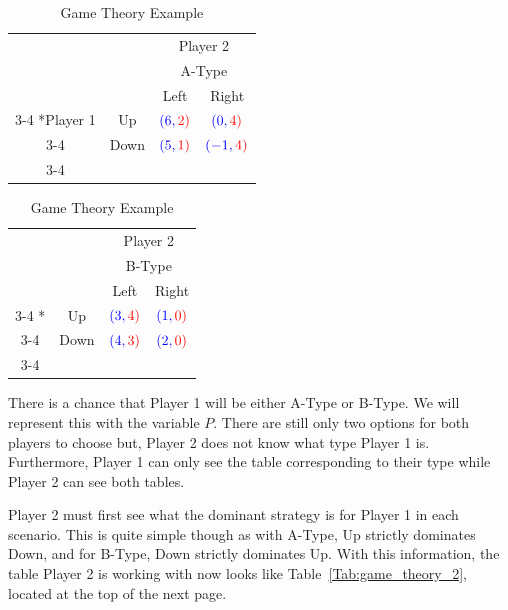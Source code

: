 \documentclass[letterpaper,12pt]{report}
\begin{document}
\begin{table}[ht]
    \setlength{\extrarowheight}{2pt}
    \begin{tabular}{cc|c|c|}
      & \multicolumn{1}{c}{} & \multicolumn{2}{c}{\color{red}Player 2}\\
      & \multicolumn{1}{c}{} & \multicolumn{2}{c}{\color{red}A-Type}\\
      & \multicolumn{1}{c}{} & \multicolumn{1}{c}{\color{red}Left}  & \multicolumn{1}{c}{\color{red}Right} \\\cline{3-4}
      \multirow{2}*{\color{blue}Player 1}  & \color{blue}Up & $\color{blue}(6,\color{red}2)$ & $\color{blue}(0,\color{red}4)$ \\\cline{3-4}
      & \color{blue}Down & $\color{blue}(5,\color{red}1)$ & $\color{blue}(-1,\color{red}4)$ \\\cline{3-4}
    \end{tabular}
    \begin{tabular}{cc|c|c|}
      & \multicolumn{1}{c}{} & \multicolumn{2}{c}{\color{red}Player 2}\\
      & \multicolumn{1}{c}{} & \multicolumn{2}{c}{\color{red}B-Type}\\
      & \multicolumn{1}{c}{} & \multicolumn{1}{c}{\color{red}Left}  & \multicolumn{1}{c}{\color{red}Right} \\\cline{3-4}
      \multirow{2}*{}  & \color{blue}Up & $\color{blue}(3,\color{red}4)$ & $\color{blue}(1,\color{red}0)$ \\\cline{3-4}
      & \color{blue}Down & $\color{blue}(4,\color{red}3)$ & $\color{blue}(2,\color{red}0)$ \\\cline{3-4}
    \end{tabular}
\caption{Game Theory Example}
\label{Tab:game_theory_1}
\end{table}

There is a chance that Player 1 will be either A-Type or B-Type. We will represent this with the variable $P$. There are still only two options for both players to choose but, Player 2 does not know what type Player 1 is. Furthermore, Player 1 can only see the table corresponding to their type while Player 2 can see both tables.

Player 2 must first see what the dominant strategy is for Player 1 in each scenario. This is quite simple though as with A-Type, Up strictly dominates Down, and for B-Type, Down strictly dominates Up. With this information, the table Player 2 is working with now looks like Table~\ref{Tab:game_theory_2}, located at the top of the next page.
\end{document}
